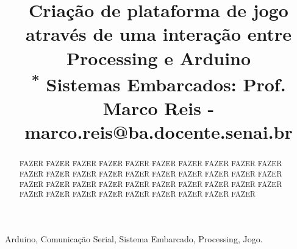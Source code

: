 \documentclass[conference]{IEEEtran}
\begin{document}
\title{Criação de plataforma de jogo através de uma interação entre Processing e Arduino\\
{\footnotesize \textsuperscript{*} Sistemas Embarcados: Prof. Marco Reis - marco.reis@ba.docente.senai.br}
}


\author{
\and
{}
\and
{}
\and
{}
}
\maketitle

\begin{abstract}
    FAZER FAZER FAZER FAZER FAZER FAZER FAZER FAZER FAZER FAZER FAZER FAZER FAZER FAZER FAZER FAZER FAZER FAZER FAZER FAZER FAZER FAZER FAZER FAZER FAZER FAZER FAZER FAZER FAZER FAZER FAZER FAZER FAZER FAZER FAZER FAZER FAZER FAZER FAZER 
\end{abstract}

\begin{IEEEkeywords}
    Arduino, Comunicação Serial, Sistema Embarcado, Processing, Jogo.
\end{IEEEkeywords}
\end{document}
